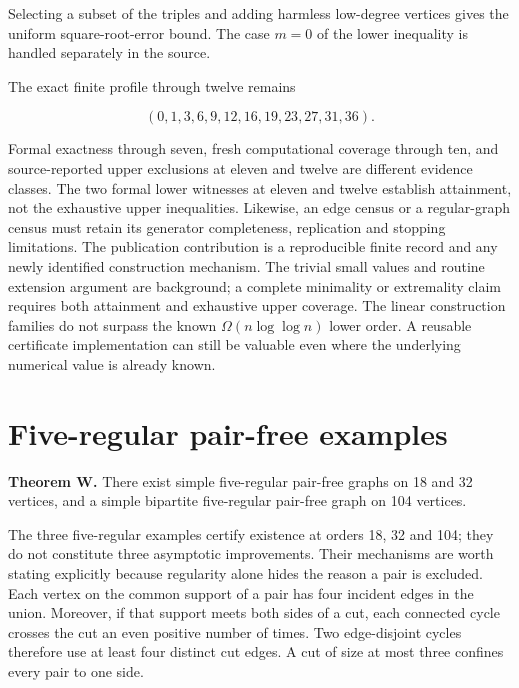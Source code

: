 \documentclass[smallextended]{svjour3}
\begin{document}
Selecting a subset of the triples and adding harmless low-degree
vertices gives the uniform square-root-error bound. The case \(m=0\) of
the lower inequality is handled separately in the source.

The exact finite profile through twelve remains

\[ (0,1,3,6,9,12,16,19,23,27,31,36). \]

Formal exactness through seven, fresh computational coverage through
ten, and source-reported upper exclusions at eleven and twelve are
different evidence classes. The two formal lower witnesses at eleven and
twelve establish attainment, not the exhaustive upper inequalities.
Likewise, an edge census or a regular-graph census must retain its
generator completeness, replication and stopping limitations. The
publication contribution is a reproducible finite record and any newly
identified construction mechanism. The trivial small values and routine
extension argument are background; a complete minimality or extremality
claim requires both attainment and exhaustive upper coverage. The linear
construction families do not surpass the known \(\Omega(n\log\log n)\)
lower order. A reusable certificate implementation can still be valuable
even where the underlying numerical value is already known.

\section{Five-regular pair-free
examples}\label{five-regular-pair-free-examples}

\textbf{Theorem W.} There exist simple five-regular pair-free graphs on
18 and 32 vertices, and a simple bipartite five-regular pair-free graph
on 104 vertices.

The three five-regular examples certify existence at orders 18, 32 and
104; they do not constitute three asymptotic improvements. Their
mechanisms are worth stating explicitly because regularity alone hides
the reason a pair is excluded. Each vertex on the common support of a
pair has four incident edges in the union. Moreover, if that support
meets both sides of a cut, each connected cycle crosses the cut an even
positive number of times. Two edge-disjoint cycles therefore use at
least four distinct cut edges. A cut of size at most three confines
every pair to one side.
\end{document}
